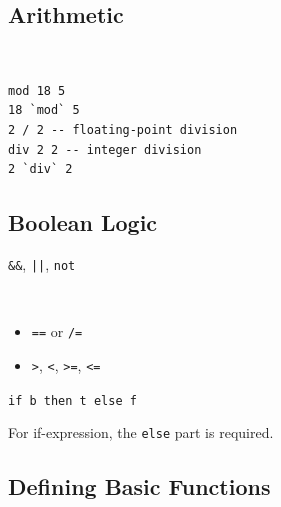 \documentclass{blog}
\begin{document}
\subsection{Arithmetic}
\begin{example}~
    \begin{verbatim}
mod 18 5
18 `mod` 5
2 / 2 -- floating-point division
div 2 2 -- integer division
2 `div` 2
\end{verbatim}
\end{example}

\subsection{Boolean Logic}
\begin{definition}
    \verb|&&|, \verb~||~, \verb|not|
\end{definition}

\begin{definition}~
    \begin{itemize}
        \item \verb|==| or \verb|/=|
        \item \verb|>|, \verb|<|, \verb|>=|, \verb|<=|
    \end{itemize}
\end{definition}

\begin{definition}[if-expression]
    \verb|if b then t else f|
\end{definition}

For if-expression, the \verb|else| part is required.

\subsection{Defining Basic Functions}


\printbibliography
\end{document}

